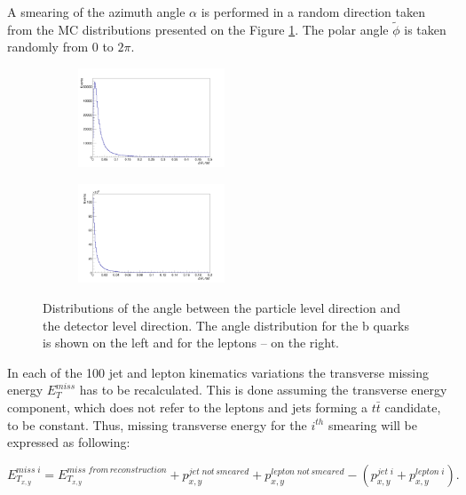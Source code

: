 A smearing of the azimuth angle $\alpha$ is performed in a random direction taken from
the MC distributions presented on the Figure \ref{fig:dAngle}. The polar angle $\tilde{\phi}$ is taken randomly from 0 to $2\pi$.

\begin{figure}[t]
\centering
\begin{subfigure}
  \centering
  \includegraphics[width=0.48\textwidth]{05_kinReco/plots/dan_jet.png}
\end{subfigure}
\begin{subfigure}
  \centering
  \includegraphics[width=0.48\textwidth]{05_kinReco/plots/dan_lep.png}
\end{subfigure}
\caption{Distributions of the angle between the particle level direction and the detector level direction.
The angle distribution for the b quarks is shown on the left and for the leptons -- on the right.}
\label{fig:dAngle}
\end{figure}

In each of the 100 jet and lepton kinematics variations the transverse missing energy $E_{T}^{miss}$ has to be recalculated. This is done
assuming the transverse energy component, which does not refer to the leptons and jets forming a $t\bar{t}$ candidate, to be constant. Thus,
missing transverse energy for the $i^{th}$ smearing will be expressed as following:

\begin{equation}
 E^{miss\;i}_{T_{x,y}} = E^{miss \; from \, reconstruction}_{T_{x,y}} + p^{jet \; not\,smeared}_{x,y} + p^{lepton\;not\,smeared}_{x,y} - (p^{jet\;i}_{x,y} + p^{lepton\;i}_{x,y}).
\end{equation}

